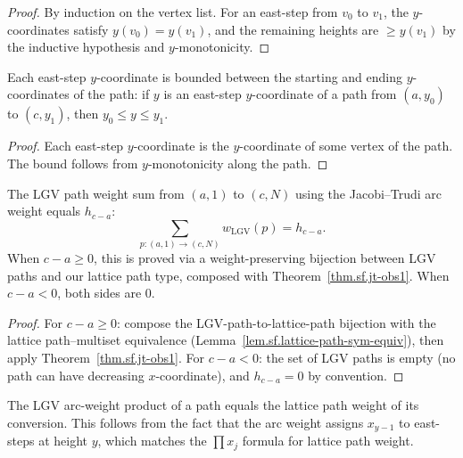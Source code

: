 \begin{proof}
\leanok
By induction on the vertex list. For an east-step from $v_0$ to $v_1$,
the $y$-coordinates satisfy $y(v_0) = y(v_1)$, and the remaining heights
are $\geq y(v_1)$ by the inductive hypothesis and $y$-monotonicity.
\end{proof}

\begin{lemma}
\label{lem.sf.lgv-east-step-bounded}
\leanhelper
\leanok
Each east-step $y$-coordinate is bounded between the starting and
ending $y$-coordinates of the path:
if $y$ is an east-step $y$-coordinate of a path from $(a, y_0)$ to $(c, y_1)$,
then $y_0 \leq y \leq y_1$.
\end{lemma}

\begin{proof}
\leanok
Each east-step $y$-coordinate is the $y$-coordinate of some vertex
of the path. The bound follows from $y$-monotonicity along the path.
\end{proof}

\begin{theorem}
\label{thm.sf.lgv-path-weight-sum-eq-hsymm-ext}
\leanhelper
\leanok
The LGV path weight sum from $(a, 1)$ to $(c, N)$ using the
Jacobi--Trudi arc weight equals $h_{c-a}$:
\[
\sum_{p : (a,1) \to (c,N)} w_{\mathrm{LGV}}(p) = h_{c-a}.
\]
When $c - a \geq 0$, this is proved via a weight-preserving bijection between
LGV paths and our lattice path type, composed with
Theorem~\ref{thm.sf.jt-obs1}. When $c - a < 0$, both sides are $0$.
\end{theorem}

\begin{proof}
For $c - a \geq 0$: compose the LGV-path-to-lattice-path bijection
with the lattice path--multiset equivalence (Lemma~\ref{lem.sf.lattice-path-sym-equiv}),
then apply Theorem~\ref{thm.sf.jt-obs1}.
For $c - a < 0$: the set of LGV paths is empty (no path can have
decreasing $x$-coordinate), and $h_{c-a} = 0$ by convention.
\end{proof}

\begin{lemma}
\label{lem.sf.lgv-path-to-lattice-path-weight}
\leanhelper
\leanok
The LGV arc-weight product of a path equals the lattice path weight
of its conversion.
This follows from the fact that the arc weight assigns $x_{y-1}$ to
east-steps at height $y$, which matches the $\prod x_j$ formula for
lattice path weight.
\end{lemma}

